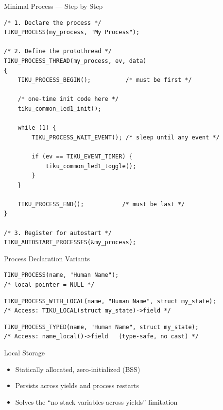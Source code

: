 \documentclass[aspectratio=169, 10pt]{beamer}
\begin{document}
\begin{frame}[fragile]{Minimal Process --- Step by Step}
\begin{lstlisting}[style=cstyle]
/* 1. Declare the process */
TIKU_PROCESS(my_process, "My Process");

/* 2. Define the protothread */
TIKU_PROCESS_THREAD(my_process, ev, data)
{
    TIKU_PROCESS_BEGIN();          /* must be first */

    /* one-time init code here */
    tiku_common_led1_init();

    while (1) {
        TIKU_PROCESS_WAIT_EVENT(); /* sleep until any event */

        if (ev == TIKU_EVENT_TIMER) {
            tiku_common_led1_toggle();
        }
    }

    TIKU_PROCESS_END();           /* must be last */
}

/* 3. Register for autostart */
TIKU_AUTOSTART_PROCESSES(&my_process);
\end{lstlisting}
\end{frame}

\begin{frame}[fragile]{Process Declaration Variants}
\begin{lstlisting}[style=cstyle, title={No local storage}]
TIKU_PROCESS(name, "Human Name");
/* local pointer = NULL */
\end{lstlisting}

\begin{lstlisting}[style=cstyle, title={With local storage (manual cast)}]
TIKU_PROCESS_WITH_LOCAL(name, "Human Name", struct my_state);
/* Access: TIKU_LOCAL(struct my_state)->field */
\end{lstlisting}

\begin{lstlisting}[style=cstyle, title={With typed accessor (recommended)}]
TIKU_PROCESS_TYPED(name, "Human Name", struct my_state);
/* Access: name_local()->field   (type-safe, no cast) */
\end{lstlisting}

\vspace{0.3em}
\begin{block}{Local Storage}
\begin{itemize}
  \item Statically allocated, zero-initialized (BSS)
  \item Persists across yields and process restarts
  \item Solves the ``no stack variables across yields'' limitation
\end{itemize}
\end{block}
\end{frame}
\end{document}
